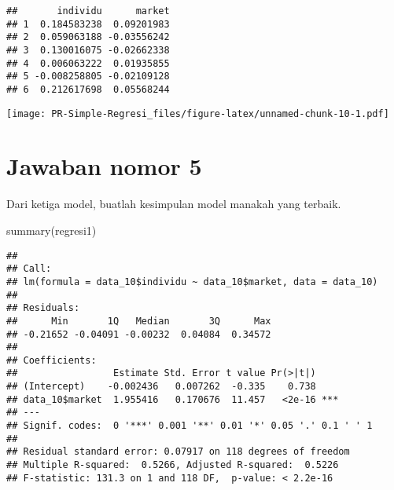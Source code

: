 \documentclass[
]{article}
\newenvironment{Shaded}{\begin{snugshade}}{\end{snugshade}}
\newcommand{\AttributeTok}[1]{\textcolor[rgb]{0.77,0.63,0.00}{#1}}
\newcommand{\FunctionTok}[1]{\textcolor[rgb]{0.00,0.00,0.00}{#1}}
\newcommand{\NormalTok}[1]{#1}
\newcommand{\OtherTok}[1]{\textcolor[rgb]{0.56,0.35,0.01}{#1}}
\newcommand{\SpecialCharTok}[1]{\textcolor[rgb]{0.00,0.00,0.00}{#1}}
\newcommand{\StringTok}[1]{\textcolor[rgb]{0.31,0.60,0.02}{#1}}
\begin{document}
\begin{verbatim}
##       individu      market
## 1  0.184583238  0.09201983
## 2  0.059063188 -0.03556242
## 3  0.130016075 -0.02662338
## 4  0.006063222  0.01935855
## 5 -0.008258805 -0.02109128
## 6  0.212617698  0.05568244
\end{verbatim}

\begin{Shaded}
\end{Shaded}

\texttt{[image: PR-Simple-Regresi\_files/figure-latex/unnamed-chunk-10-1.pdf]}

\hypertarget{jawaban-nomor-5}{%
\section{Jawaban nomor 5}\label{jawaban-nomor-5}}

Dari ketiga model, buatlah kesimpulan model manakah yang terbaik.

\begin{Shaded}
\begin{Highlighting}[]
\FunctionTok{summary}\NormalTok{(regresi1)}
\end{Highlighting}
\end{Shaded}

\begin{verbatim}
## 
## Call:
## lm(formula = data_10$individu ~ data_10$market, data = data_10)
## 
## Residuals:
##      Min       1Q   Median       3Q      Max 
## -0.21652 -0.04091 -0.00232  0.04084  0.34572 
## 
## Coefficients:
##                 Estimate Std. Error t value Pr(>|t|)    
## (Intercept)    -0.002436   0.007262  -0.335    0.738    
## data_10$market  1.955416   0.170676  11.457   <2e-16 ***
## ---
## Signif. codes:  0 '***' 0.001 '**' 0.01 '*' 0.05 '.' 0.1 ' ' 1
## 
## Residual standard error: 0.07917 on 118 degrees of freedom
## Multiple R-squared:  0.5266, Adjusted R-squared:  0.5226 
## F-statistic: 131.3 on 1 and 118 DF,  p-value: < 2.2e-16
\end{verbatim}
\end{document}
